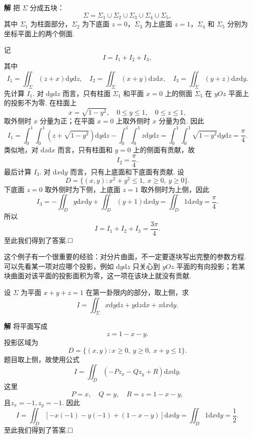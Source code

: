 \documentclass{ctexart}
\newenvironment{custom}[1]{\par\noindent \textbf{#1}\quad}{\par\vspace{1em}}
\begin{document}
\begin{custom}{解}
把 $\Sigma$ 分成五块：
\[
\Sigma=\Sigma_{1}\cup\Sigma_{2}\cup\Sigma_{3}\cup\Sigma_{4}\cup\Sigma_{5},
\]
其中 $\Sigma_{1}$ 为柱面部分，$\Sigma_{2}$ 为下底面 $z=0$，$\Sigma_{3}$ 为上底面 $z=1$，$\Sigma_{4}$ 和 $\Sigma_{5}$ 分别为坐标平面上的两个侧面.

记
\[
I=I_{1}+I_{2}+I_{3},
\]
其中
\[
I_{1}=\iint_{\Sigma}(z+x)\mathrm{d}y\mathrm{d}z,\quad
I_{2}=\iint_{\Sigma}(x+y)\mathrm{d}z\mathrm{d}x,\quad
I_{3}=\iint_{\Sigma}(y+z)\mathrm{d}x\mathrm{d}y.
\]
先计算 $I_{1}$. 对 $\mathrm{d}y\mathrm{d}z$ 而言，只有柱面 $\Sigma_{1}$ 和平面 $x=0$ 上的侧面 $\Sigma_{5}$ 在 $yOz$ 平面上的投影不为零. 在柱面上
\[
x=\sqrt{1-y^{2}},\quad 0\leqslant y\leqslant 1,\quad 0\leqslant z\leqslant 1,
\]
取外侧时 $x$ 分量为正；在平面 $x=0$ 上取外侧时 $x$ 分量为负. 因此
\[
I_{1}=\int_{0}^{1}\int_{0}^{1}
\left(z+\sqrt{1-y^{2}}\right)\mathrm{d}y\mathrm{d}z
-\int_{0}^{1}\int_{0}^{1}z\mathrm{d}y\mathrm{d}z=\int_{0}^{1}\int_{0}^{1}\sqrt{1-y^{2}}\mathrm{d}y\mathrm{d}z=\frac{\pi}{4}.
\]
类似地，对 $\mathrm{d}z\mathrm{d}x$ 而言，只有柱面和 $y=0$ 上的侧面有贡献，故
\[
I_{2}=\frac{\pi}{4}.
\]
最后计算 $I_{3}$. 对 $\mathrm{d}x\mathrm{d}y$ 而言，只有上底面和下底面有贡献. 设
\[
D=\{(x,y):x^{2}+y^{2}\leqslant 1,\ x\geqslant 0,\ y\geqslant 0\}.
\]
下底面 $z=0$ 取外侧时为下侧，上底面 $z=1$ 取外侧时为上侧，因此
\[
I_{3}=-\iint_{D}y\mathrm{d}x\mathrm{d}y
+\iint_{D}(y+1)\mathrm{d}x\mathrm{d}y=\iint_{D}1\mathrm{d}x\mathrm{d}y=\frac{\pi}{4}.
\]
所以
\[
I=I_{1}+I_{2}+I_{3}
=\frac{3\pi}{4}.
\]
至此我们得到了答案.$\hfill{\square}$
\end{custom}

这个例子有一个很重要的经验：对分片曲面，不一定要逐块写出完整的参数方程. 可以先看某一项对应哪个投影，例如 $\mathrm{d}y\mathrm{d}z$ 只关心到 $yOz$ 平面的有向投影；若某块曲面对该平面的投影面积为零，这一项在该块上就没有贡献.

\begin{example}
设 $\Sigma$ 为平面 $x+y+z=1$ 在第一卦限内的部分，取上侧，求
\[
I=\iint_{\Sigma}x\mathrm{d}y\mathrm{d}z+y\mathrm{d}z\mathrm{d}x+z\mathrm{d}x\mathrm{d}y.
\]
\end{example}

\begin{custom}{解}
将平面写成
\[
z=1-x-y.
\]
投影区域为
\[
D=\{(x,y):x\geqslant 0,\ y\geqslant 0,\ x+y\leqslant 1\}.
\]
题目取上侧，故使用公式
\[
I=\iint_{D}(-Pz_{x}-Qz_{y}+R)\mathrm{d}x\mathrm{d}y.
\]
这里
\[
P=x,\quad Q=y,\quad R=z=1-x-y,
\]
且$z_{x}=-1,z_{y}=-1.$
因此
\[
I=\iint_{D}\left[-x(-1)-y(-1)+(1-x-y)\right]\mathrm{d}x\mathrm{d}y=\iint_{D}1\mathrm{d}x\mathrm{d}y=\frac{1}{2}.
\]
至此我们得到了答案.$\hfill{\square}$
\end{custom}
\end{document}
